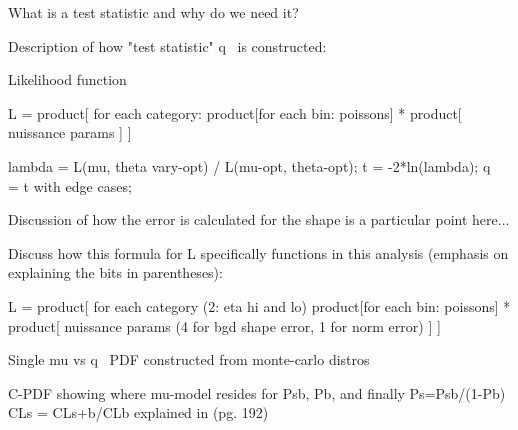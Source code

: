 What is a test statistic and why do we need it?

Description of how "test statistic" q~ is constructed:

    Likelihood function

        L = product[ for each category:
            product[for each bin: poissons]
            * product[ nuissance params ] 
        ]

        
    lambda = L(mu, theta vary-opt) / L(mu-opt, theta-opt);
    t = -2*ln(lambda);
    q~ = t with edge cases;

%
%
Discussion of how the error is calculated for the shape is a particular point here...

Discuss how this formula for L specifically functions in this analysis
    (emphasis on explaining the bits in parentheses):

        L = product[ for each category (2: eta hi and lo) 
            product[for each bin: poissons]
            * product[ nuissance params (4 for bgd shape error, 1 for norm error) ] 
        ]

    
%
%

Single mu vs q~ PDF constructed from monte-carlo distros

C-PDF showing where mu-model resides for Psb, Pb, and finally Ps=Psb/(1-Pb)
CLs = CLs+b/CLb explained in \cite{Barlow:2019svl} (pg. 192)

